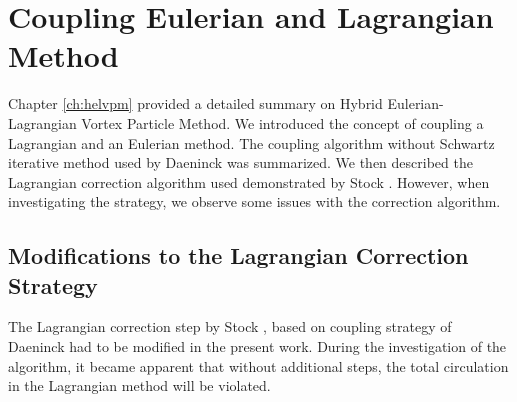 \chapter{Coupling Eulerian and Lagrangian Method}
\label{ch:coupling}


Chapter \ref{ch:helvpm} provided a detailed summary on Hybrid Eulerian-Lagrangian Vortex Particle Method. We introduced the concept of coupling a Lagrangian and an Eulerian method. The coupling algorithm without Schwartz iterative method used by Daeninck \cite{Daeninck2006} was summarized. We then described the Lagrangian correction algorithm used demonstrated by Stock \cite{Stock2010a}. However, when investigating the strategy, we observe some issues with the correction algorithm.

\section{Modifications to the Lagrangian Correction Strategy}
\label{seec:coupling-mthlcs}
The Lagrangian correction step by Stock \cite{Stock2010a}, based on coupling strategy of Daeninck \cite{Daeninck2006} had to be modified in the present work. During the investigation of the algorithm, it became apparent that without additional steps, the total circulation in the Lagrangian method will be violated.

